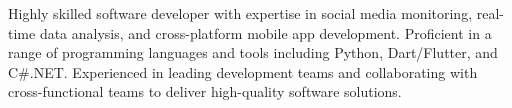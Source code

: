 \newline
\newline
\begin{cvparagraph}
Highly skilled software developer with expertise in social media
monitoring, real-time data analysis, and cross-platform mobile app
development. Proficient in a range of programming languages and
tools including Python, Dart/Flutter, and C\#.NET. Experienced in
leading development teams and collaborating with cross-functional
teams to deliver high-quality software solutions.
\end{cvparagraph}
